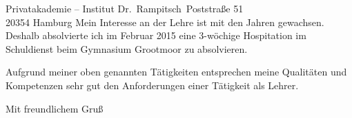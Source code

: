 \documentclass[ebner,paper=a4,fontsize=11pt,ngerman,BCOR=10mm]{scrlttr2}%
\begin{document}
\begin{letter}{ Privatakademie – Institut Dr.~Rampitsch\
Poststra{\ss}e 51\\ 
20354 Hamburg}
Mein Interesse an der Lehre ist mit den Jahren gewachsen. Deshalb absolvierte
ich im Februar 2015 eine 3-w{\"o}chige Hospitation im Schuldienst beim
Gymnasium Grootmoor zu absolvieren.


%

Aufgrund meiner oben genannten T{\"a}tigkeiten entsprechen meine Qualit{\"a}ten und
Kompetenzen sehr gut den Anforderungen einer T{\"a}tigkeit als Lehrer. 


\closing{Mit freundlichem Gru\ss}
\enlargethispage{6\baselineskip}

\end{letter}
\end{document}
